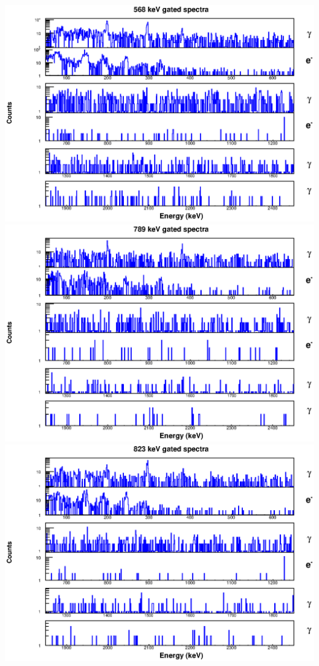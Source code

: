 \begin{landscape}
\includegraphics[scale=1.1]{156Gd_Appendix/568_combined.eps}
\includegraphics[scale=1.1]{156Gd_Appendix/789_combined.eps}
\includegraphics[scale=1.1]{156Gd_Appendix/823_combined.eps}

\end{landscape}
